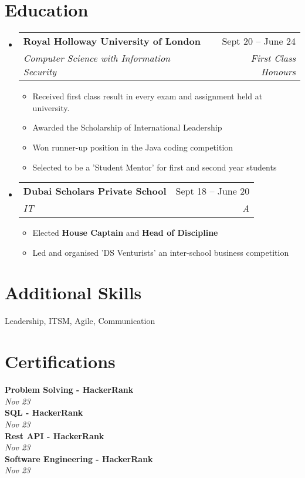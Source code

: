 \documentclass[letterpaper,11pt]{article}
\makeatletter
\newcommand{\resumeItem}[1]{
  \item\small{
    {#1 \vspace{-2pt}}
  }
}
\newcommand{\resumeSubheading}[4]{
  \vspace{-2pt}\item
    \begin{tabular*}{0.97\textwidth}[t]{l@{\extracolsep{\fill}}r}
      \textbf{#1} & #2 \\
      \textit{\small#3} & \textit{\small #4} \\
    \end{tabular*}\vspace{-7pt}
}
\newcommand{\resumeSubHeadingListStart}{\begin{itemize}[leftmargin=0.15in, label={}]}
\newcommand{\resumeSubHeadingListEnd}{\end{itemize}}
\newcommand{\resumeItemListStart}{\begin{itemize}}
\newcommand{\resumeItemListEnd}{\end{itemize}\vspace{-5pt}}
\makeatother
\begin{document}
    \section{Education}
      \resumeSubHeadingListStart
            \resumeSubheading
            {Royal Holloway University of London}{Sept 20 -- June 24}
            {Computer Science with Information Security}{First Class Honours}
            \resumeItemListStart
                \resumeItem{Received first class result in every exam and assignment held at university.}
                \resumeItem{Awarded the Scholarship of International Leadership}
                \resumeItem{Won runner-up position in the Java coding competition}
                \resumeItem{Selected to be a 'Student Mentor' for first and second year students}
            \resumeItemListEnd
            \resumeSubheading
            {Dubai Scholars Private School}{Sept 18 -- June 20}
            {IT}{A}
            \resumeItemListStart
                \resumeItem{Elected \textbf{House Captain} and \textbf{Head of Discipline}}
                \resumeItem{Led and organised 'DS Venturists' an inter-school business competition}
            \resumeItemListEnd
      \resumeSubHeadingListEnd


    \section*{Additional Skills}
            Leadership, 
            ITSM, 
            Agile, 
            Communication

    \section{Certifications}
      \begin{itemize}[leftmargin=0.15in, label={}]
        \small{\item{
         \textbf{Problem Solving - HackerRank} \\
         \textit{Nov 23 } \\
         \textbf{SQL - HackerRank} \\
         \textit{Nov 23 } \\
         \textbf{Rest API - HackerRank} \\
         \textit{Nov 23 } \\
         \textbf{Software Engineering - HackerRank} \\
         \textit{Nov 23 } \\
        }}
     \end{itemize}
\end{document}

